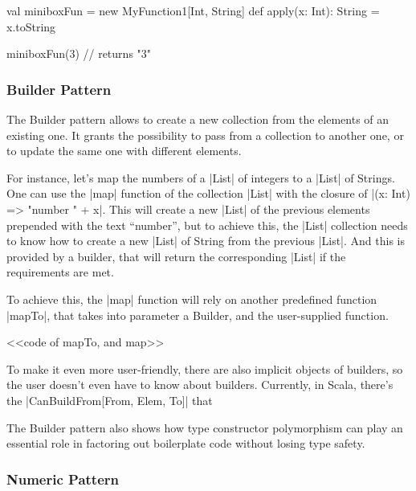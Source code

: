 \begin{lstlisting-nobreak}
 val miniboxFun = new MyFunction1[Int, String] {
   def apply(x: Int): String = x.toString
 }
 
 miniboxFun(3)    // returns "3"
\end{lstlisting-nobreak}

\subsubsection{Builder Pattern}

The Builder pattern allows to create a new collection from the elements of an existing one. It grants the possibility to pass from a collection to another one, or to update the same one with different elements.


For instance, let's map the numbers of a |List| of integers to a |List| of Strings. One can use the |map| function of the collection |List| with the closure of |(x: Int) => "number " + x|. This will create a new |List| of the previous elements prepended with the text ``number'', but to achieve this, the |List| collection needs to know how to create a new |List| of String from the previous |List|. And this is provided by a builder, that will return the corresponding |List| if the requirements are met.

To achieve this, the |map| function will rely on another predefined function |mapTo|, that takes into parameter a Builder, and the user-supplied function.

<<code of mapTo, and map>>


To make it even more user-friendly, there are also implicit objects of builders, so the user doesn't even have to know about builders. Currently, in Scala, there's the |CanBuildFrom[From, Elem, To]| that 

The Builder pattern also shows how type constructor polymorphism can play an essential role in factoring out boilerplate code without losing type safety.\cite{adriaan}

\subsubsection{Numeric Pattern}

